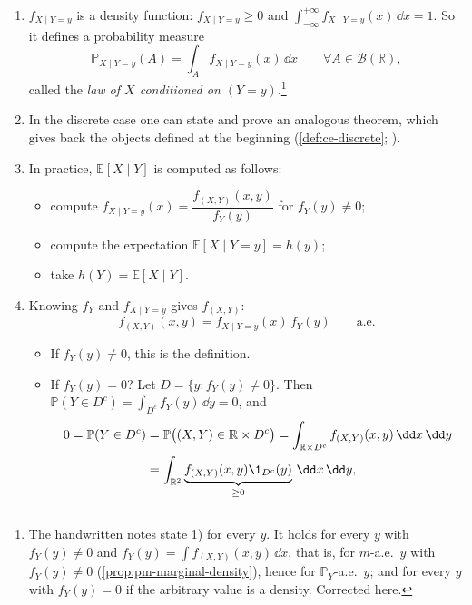 \begin{remark}\label{rem:ce-density-remarks}
\leavevmode
\begin{enumerate}[label=\arabic*),leftmargin=*]
  \item $f_{X\mid Y=y}$ is a density function: $f_{X\mid Y=y}\ge0$ and
    $\int_{-\infty}^{+\infty}f_{X\mid Y=y}(x)\,\dd x=1$. So it defines a probability measure
    \[
      \mathbb P_{X\mid Y=y}(A)=\int_Af_{X\mid Y=y}(x)\,\dd x\qquad\forall A\in\mathcal B(\mathbb R),
    \]
    called the \emph{law of $X$ conditioned on $(Y=y)$}.\footnote{The handwritten notes state
    1) for every $y$. It holds for every $y$ with $f_Y(y)\ne0$ and
    $f_Y(y)=\int f_{(X,Y)}(x,y)\,\dd x$, that is, for $m$-a.e.\ $y$ with $f_Y(y)\ne0$
    (\cref{prop:pm-marginal-density}), hence for $\mathbb P_Y$-a.e.\ $y$; and for every $y$
    with $f_Y(y)=0$ if the arbitrary value is a density. Corrected here.}
  \item In the discrete case one can state and prove an analogous theorem, which gives back
    the objects defined at the beginning (\cref{def:ce-discrete}; ).
  \item In practice, $\mathbb E[X\mid Y]$ is computed as follows:
    \begin{itemize}
      \item compute $f_{X\mid Y=y}(x)=\dfrac{f_{(X,Y)}(x,y)}{f_Y(y)}$ for $f_Y(y)\ne0$;
      \item compute the expectation $\mathbb E[X\mid Y=y]=h(y)$;
      \item take $h(Y)=\mathbb E[X\mid Y]$.
    \end{itemize}
  \item Knowing $f_Y$ and $f_{X\mid Y=y}$ gives $f_{(X,Y)}$:
    \begin{equation}\label{eq:ce-joint-from-conditional}
      f_{(X,Y)}(x,y)=f_{X\mid Y=y}(x)\,f_Y(y)\qquad\text{a.e.}
    \end{equation}
    \begin{itemize}
      \item If $f_Y(y)\ne0$, this is the definition.
      \item If $f_Y(y)=0$? Let $D=\{y:f_Y(y)\ne0\}$. Then $\mathbb P(Y\in D^c)=\int_{D^c}f_Y(y)\,\dd y=0$,
        and
        \[
          \begin{aligned}
          0=\mathbb P(Y\in D^c)&=\mathbb P\big((X,Y)\in\mathbb R\times D^c\big)
          =\int_{\mathbb R\times D^c}f_{(X,Y)}(x,y)\,\dd x\,\dd y\\
          &=\int_{\mathbb R^2}\underbrace{f_{(X,Y)}(x,y)\1_{D^c}(y)}_{\ge0}\,\dd x\,\dd y,

\end{aligned}\]
\end{itemize}
\end{enumerate}
\end{remark}
